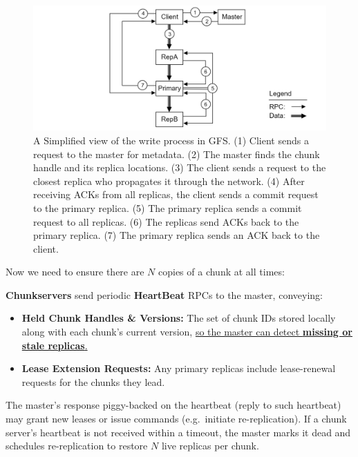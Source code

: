 \begin{figure}[h]
  \centering
  \includegraphics[width=\textwidth]{Sections/gfs/write.png}
  \caption{A Simplified view of the write process in GFS. (1) Client sends a request to the master for metadata. (2) The master finds the chunk handle and its replica locations. 
  (3) The client sends a request to the closest replica who propagates it through the network. (4) After receiving ACKs from all replicas, the client sends a commit request to the primary replica. (5) The primary replica sends a commit request to all replicas. (6) The replicas send ACKs back to the primary replica. (7) The primary replica sends an ACK back to the client.}
  \label{fig:gfs-write}
\end{figure}

\noindent
Now we need to ensure there are $N$ copies of a chunk at all times:
\begin{Def}
  \textbf{Chunkservers} send periodic \textbf{HeartBeat} RPCs to the master, conveying:
  \begin{itemize}
    \item \textbf{Held Chunk Handles \& Versions:} The set of chunk IDs stored locally along with each chunk's current version, \underline{so the master can detect \textbf{missing or stale replicas}.}
    \item \textbf{Lease Extension Requests:} Any primary replicas include lease-renewal requests for the chunks they lead.
  \end{itemize}
  \noindent
  The master's response piggy-backed on the heartbeat (reply to such heartbeat) may grant new leases or issue commands (e.g.\ initiate re-replication). If a chunk server's heartbeat is not received within a timeout, the master marks it dead and schedules re-replication to restore $N$ live replicas per chunk.
\end{Def}

